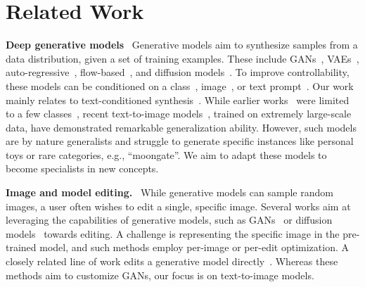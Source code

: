 \section{Related Work}

  \textbf{Deep generative models} \  Generative models aim to synthesize samples from a data distribution, given a set of training examples. These include GANs~\cite{goodfellow2020generative,stylegan3,biggan}, VAEs~\cite{kingma2013auto}, auto-regressive~\cite{esser2021taming,razavi2019generating,van2016pixel}, flow-based~\cite{dinh2014nice,dinh2016density}, and diffusion models~\cite{ho2020denoising,sohl2015deep,dhariwal2021diffusion}. To improve controllability, these models can be conditioned on a class~\cite{biggan,sauer2022stylegan}, image~\cite{isola2017image,wang2018pix2pixHD,zhu2017unpaired,meng2021sdedit}, or text prompt~\cite{zhu2019dm,tao2020df,nichol2021glide}. Our work mainly relates to text-conditioned synthesis~\cite{mansimov2015generating}.  While earlier works~\cite{reed2016generative, zhang2017stackgan,zhu2019dm,tao2020df,xu2018attngan,huang2022multimodal} were limited to a few classes~\cite{wah2011caltech,lin2014microsoft}, recent text-to-image models~\cite{nichol2021glide,saharia2022photorealistic,rombach2022high,ramesh2022hierarchical,dhariwal2021diffusion,ramesh2021zero,yu2022scaling}, trained on  extremely large-scale data, have demonstrated remarkable generalization ability. However, such models are by nature generalists and struggle to generate specific instances like personal toys or rare categories, e.g., ``moongate''. We aim to adapt these models to become specialists in new concepts.

  \textbf{Image and model editing.} \  While generative models can sample random images, a user often wishes to edit a single, specific image. Several works aim at leveraging the capabilities of generative models, such as GANs~\cite{zhu2016generative,patashnik2021styleclip,abdal2019image2stylegan,abdal2020image2stylegan++,abdal2022clip2stylegan} or diffusion models~\cite{choi2021ilvr, nichol2021glide,kim2022diffusionclip} towards editing. A challenge is representing the specific image in the pre-trained model, and such methods employ per-image or per-edit optimization. A closely related line of work edits a generative model directly~\cite{bau2020rewriting,wang2022rewriting,gal2022stylegan}. Whereas these methods aim to customize GANs, our focus is on text-to-image models.


